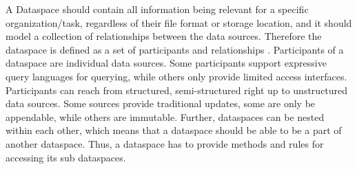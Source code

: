 



A Dataspace should contain all information being relevant for a specific organization/task, regardless of their file format or storage location, and it should model a collection of relationships between the data sources. Therefore the dataspace is defined as a set of participants and relationships \cite[p. 29]{Franklin:2005:DDN:1107499.1107502}. 
Participants of a dataspace are individual data sources. 
Some participants support expressive query languages for querying, while others only provide limited access interfaces. 
Participants can reach from structured, semi-structured right up to unstructured data sources. Some sources provide traditional updates, some are only be appendable, while others are immutable. Further, dataspaces can be nested within each other, which means that a dataspace should be able to be a part of another dataspace.  Thus, a dataspace has to provide methods and rules for accessing its sub dataspaces.

